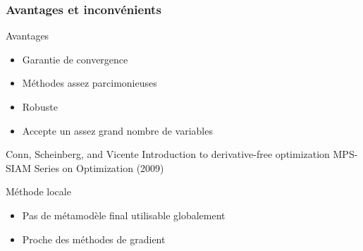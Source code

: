 \begin{frame}
\frametitle{Avantages et inconvénients}
\begin{block}{Avantages}
\begin{itemize}
 \item Garantie de convergence
 \item Méthodes assez parcimonieuses
 \item Robuste
 \item Accepte un assez grand nombre de variables
\end{itemize}
\scriptsize{
 \begin{thebibliography}{1}
\beamertemplatearticlebibitems
     Conn, Scheinberg, and Vicente
         \newblock Introduction to derivative-free optimization
         \newblock MPS-SIAM Series on Optimization (2009)
 \end{thebibliography}}
\end{block}

\begin{alertblock}{Méthode locale}
\begin{itemize}
 \item Pas de métamodèle final utilisable globalement
 \item Proche des méthodes de gradient
\end{itemize}
\end{alertblock}
\end{frame}

